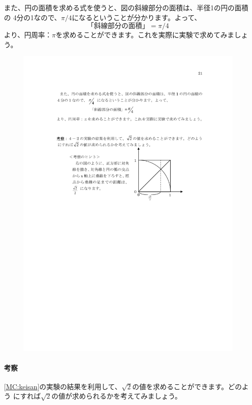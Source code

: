 また、円の面積を求める式を使うと、図の斜線部分の面積は、半径1の円の面積の 
4分の1なので、$\pi/4$になるということが分かります。よって、 
\[ 
「斜線部分の面積」= \pi/4
\]
より、円周率：$\pi$を求めることができます。これを実際に実験で求めてみましょう。

\bigskip


\begin{figure}
\vspace*{-0.8cm}
\includegraphics[bb=303 425 461 582]{08_MonteCarlo/montecarlo2.pdf}
\end{figure}

\paragraph{考察}
\ref{MC:keisan}の実験の結果を利用して、$\sqrt{2}$の値を求めることができます。どのよう
にすれば$\sqrt{2}$の値が求められるかを考えてみましょう。

